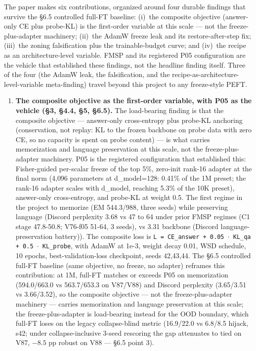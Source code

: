 \documentclass[11pt]{article}
\begin{document}
The paper makes six contributions, organized around four durable findings that survive the \S6.5 controlled full-FT baseline: (i)~the composite objective (answer-only CE plus probe-KL) is the first-order variable at this scale --- not the freeze-plus-adapter machinery; (ii)~the AdamW freeze leak and its restore-after-step fix; (iii)~the zoning falsification plus the trainable-budget curve; and (iv)~the recipe as an architecture-level variable. FMSP and its registered P05 configuration are the vehicle that established these findings, not the headline finding itself. Three of the four (the AdamW leak, the falsification, and the recipe-as-architecture-level-variable meta-finding) travel beyond this project to any freeze-style PEFT.

\begin{enumerate}
\item \textbf{The composite objective as the first-order variable, with P05 as the vehicle (\S3, \S4.4, \S5, \S6.5).} The load-bearing finding is that the composite objective --- answer-only cross-entropy plus probe-KL anchoring (conservation, not replay: KL to the frozen backbone on probe data with zero CE, so no capacity is spent on probe content) --- is what carries memorization and language preservation at this scale, not the freeze-plus-adapter machinery. P05 is the registered configuration that established this: Fisher-guided per-scalar freeze of the top 5\%, zero-init rank-16 adapter at the final norm (4{,}096 parameters at d\_model=128: 0.41\% of the 1M preset; the rank-16 adapter scales with d\_model, reaching 5.3\% of the 10K preset), answer-only cross-entropy, and probe-KL at weight 0.5. The first regime in the project to memorize (EM 544.3/988, three seeds) while preserving language (Discord perplexity 3.68 vs 47 to 64 under prior FMSP regimes (C1 stage 47.8-50.8; V76-f05 51-64, 3 seeds), vs 3.31 backbone (Discord language-preservation battery)). The composite loss is \texttt{L = CE\_answer + 0.05 $\cdot$ KL\_qa + 0.5 $\cdot$ KL\_probe}, with AdamW at 1e-3, weight decay 0.01, WSD schedule, 10 epochs, best-validation-loss checkpoint, seeds 42,43,44. The \S6.5 controlled full-FT baseline (same objective, no freeze, no adapter) reframes this contribution: at 1M, full-FT matches or exceeds P05 on memorization (594.0/663.0 vs 563.7/653.3 on V87/V88) and Discord perplexity (3.65/3.51 vs 3.66/3.52), so the composite objective --- not the freeze-plus-adapter machinery --- carries memorization and language preservation at this scale; the freeze-plus-adapter is load-bearing instead for the OOD boundary, which full-FT loses on the legacy collapse-blind metric (16.9/22.0 vs 6.8/8.5 hijack, s42; under collapse-inclusive 3-seed rescoring the gap attenuates to tied on V87, $-8.5$ pp robust on V88 --- \S6.5 point 3).


\end{enumerate}
\end{document}
